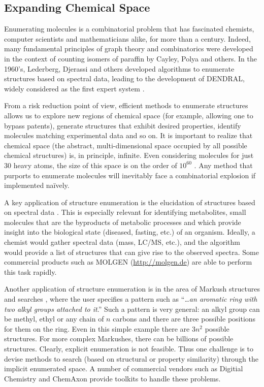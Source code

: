 \documentclass{sig-alternate}
\begin{document}
\subsection{Expanding Chemical Space}
\label{sec:struct-enum}
Enumerating molecules is a combinatorial problem that has fascinated
chemists, computer scientists and mathematicians alike, for more than
a century. Indeed, many fundamental principles of graph theory and
combinatorics were developed in the context of counting isomers of
paraffin by Cayley, Polya and others. In the 1960's, Lederberg,
Djerassi and others developed algorithms to enumerate structures
based on spectral data, leading to the development of DENDRAL, widely
considered as the first expert system \cite{DENDRAL}.

From a risk reduction point of view, efficient methods to enumerate
structures allows us to explore new regions of chemical space (for
example, allowing one to bypass patents), generate structures that
exhibit desired properties, identify molecules matching experimental
data and so on. It is important to realize that chemical space (the
abstract, multi-dimensional space occupied by all possible chemical
structures) is, in principle, infinite. Even considering molecules for
just 30 heavy atoms, the size of this space is on the order of
$10^{60}$ \cite{Bohacek:1996ve}. Any method that purports to enumerate
molecules will inevitably face a combinatorial explosion if
implemented na\"{i}vely.

A key application of structure enumeration is the elucidation of
structures based on spectral data \cite{Kind:2010zr}. This is
especially relevant for identifying metabolites, small molecules
that are the byproducts of metabolic processes and which provide
insight into the biological state (diseased, fasting, etc.) of an
organism. Ideally, a chemist would gather spectral data (mass, LC/MS, etc.),
and the algorithm would provide a list of structures that can give
rise to the observed spectra. Some commercial products such as MOLGEN
(\url{http://molgen.de}) are able to perform this task rapidly.

Another application of structure enumeration is in the area of Markush
structures and searches \cite{Barnard:1991vn}, where the user
specifies a pattern such as ``\emph{\ldots an aromatic ring with two
  alkyl groups attached to it}.'' Such a pattern is very general: an
alkyl group can be methyl, ethyl or any chain of $n$ carbons and there
are three possible positions for them on the ring. Even in this simple
example there are $3n^2$ possible structures. For more complex
Markushes, there can be billions of possible structures. Clearly,
explicit enumeration is not feasible. Thus one challenge is to devise
methods to search (based on structural or property similarity) through
the implicit enumerated space. A number of commercial vendors such as
Digitial Chemistry and ChemAxon provide toolkits to handle these
problems.
\end{document}
